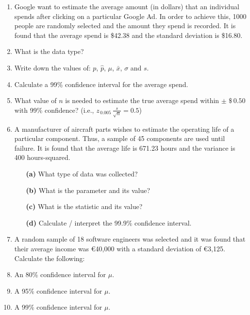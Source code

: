 \documentclass[]{report}
\begin{document}
\begin{enumerate}
\item 
Google want to estimate the average amount (in dollars) that an individual spends after clicking on a particular Google Ad. 
In order to achieve this, 1000 people are randomly selected and the amount they spend is recorded. 
It is found that the average spend is \$42.38 and the standard deviation is \$16.80.\\


\item What is the data type? 
 \item Write down the values of: $p$, $\hat p$, $\mu$, $\bar x$, $\sigma$ and $s$. 
 \item Calculate a 99\% confidence interval for the average spend. 
 \item What value of $n$ is needed to estimate the true average spend within $\pm \,\, \$\,0.50$ with 99\% confidence? (i.e., $z_{\,0.005}\,\frac{s}{\sqrt{n}} = 0.5$)





\item 
A manufacturer of aircraft parts wishes to estimate the operating life of a particular component. Thus, a sample of 45 components are used until failure. It is found that the average life is 671.23 hours and the variance is 400 hours-squared.
\begin{itemize}
\item[{\bf(a)}] What type of data was collected? 
 \item[{\bf(b)}] What is the parameter and its value? 
 \item[{\bf(c)}] What is the statistic and its value? 
 \item[{\bf(d)}] Calculate / interpret the 99.9\% confidence interval.
\end{itemize}




\item 
A random sample of 18 software engineers was selected and it was found that their average income was \euro{40,000} with a standard deviation of \euro{3,125}. \\

Calculate the following:\\[0.2cm]
\item An 80\% confidence interval for $\mu$. 
 \item A 95\% confidence interval for $\mu$. 
 \item A 99\% confidence interval for $\mu$.


\end{enumerate}
\end{document}
